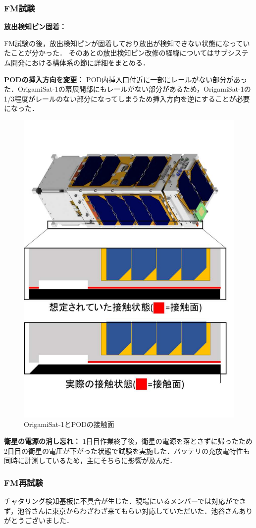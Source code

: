 \subsubsection{FM試験}
\textbf{放出検知ピン固着：}\par
FM試験の後，放出検知ピンが固着しており放出が検知できない状態になっていたことが分かった．
そのあとの放出検知ピン改修の経緯についてはサブシステム開発における構体系の節に詳細をまとめる．

\textbf{PODの挿入方向を変更：}
POD内挿入口付近に一部にレールがない部分があった．OrigamiSat-1の幕展開部にもレールがない部分があるため，OrigamiSat-1の1/3程度がレールのない部分になってしまうため挿入方向を逆にすることが必要になった．
\begin{figure}[H]
	\centering
	\includegraphics[width=0.7\linewidth]{04/fig/4-3-7.pdf}
	\caption{OrigamiSat-1とPODの接触面}
	\label{fig4-3-1}
\end{figure}



\textbf{衛星の電源の消し忘れ：}
1日目作業終了後，衛星の電源を落とさずに帰ったため2日目の衛星の電圧が下がった状態で試験を実施した．バッテリの充放電特性も同時に計測しているため，主にそちらに影響が及んだ．

\subsubsection{FM再試験}
チャタリング検知基板に不具合が生じた．現場にいるメンバーでは対応ができず，池谷さんに東京からわざわざ来てもらい対応していただいた．池谷さんありがとうございました．

